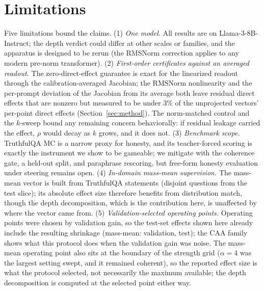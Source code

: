 \section{Limitations}\label{sec:limitations}

Five limitations bound the claims. (1) \emph{One model.} All results are on Llama-3-8B-Instruct; the depth verdict could differ at other scales or families, and the apparatus is designed to be rerun (the RMSNorm correction applies to any modern pre-norm transformer). (2) \emph{First-order certificates against an averaged readout.} The zero-direct-effect guarantee is exact for the linearized readout through the calibration-averaged Jacobian; the RMSNorm nonlinearity and the per-prompt deviation of the Jacobian from its average both leave residual direct effects that are nonzero but measured to be under $3\%$ of the unprojected vectors' per-point direct effects (Section~\ref{sec:method}). The norm-matched control and the $k$-sweep bound any remaining concern behaviorally: if residual leakage carried the effect, $\rho$ would decay as $k$ grows, and it does not. (3) \emph{Benchmark scope.} TruthfulQA MC is a narrow proxy for honesty, and its teacher-forced scoring is exactly the instrument we show to be gameable; we mitigate with the coherence gate, a held-out split, and paraphrase rescoring, but free-form honesty evaluation under steering remains open. (4) \emph{In-domain mass-mean supervision.} The mass-mean vector is built from TruthfulQA statements (disjoint questions from the test slice); its absolute effect size therefore benefits from distribution match, though the depth decomposition, which is the contribution here, is unaffected by where the vector came from. (5) \emph{Validation-selected operating points.} Operating points were chosen by validation gain, so the test-set effects shown here already include the resulting shrinkage (mass-mean: \MmValDelta{} validation, \MmTestDelta{} test); the CAA family shows what this protocol does when the validation gain was noise. The mass-mean operating point also sits at the boundary of the strength grid ($\alpha{=}4$ was the largest setting swept, and it remained coherent), so the reported effect size is what the protocol selected, not necessarily the maximum available; the depth decomposition is computed at the selected point either way.
